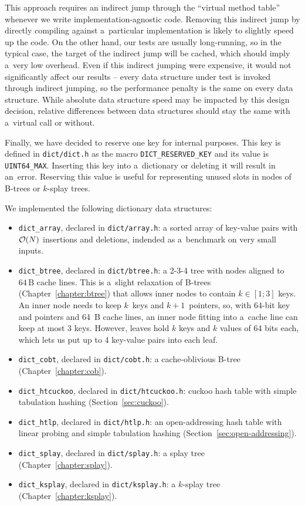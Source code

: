 This approach requires an indirect jump through the ``virtual method table''
whenever we write implementation-agnostic code. Removing this indirect jump
by directly compiling against a~particular implementation is likely to slightly
speed up the code. On the other hand, our tests are usually long-running, so in
the typical case, the target of the indirect jump will be cached, which should
imply a~very low overhead. Even if this indirect jumping were expensive, it
would not significantly affect our results -- every data structure under test
is invoked through indirect jumping, so the performance penalty is the same
on every data structure. While absolute data structure speed may be impacted
by this design decision, relative differences between data structures should
stay the same with a~virtual call or without.

Finally, we have decided to reserve one key for internal purposes.
This key is defined in \texttt{dict/dict.h} as the macro
\texttt{DICT\_RESERVED\_KEY} and its value is \texttt{UINT64\_MAX}.
Inserting this key into a~dictionary or deleting it will result in an~error.
Reserving this value is useful for representing unused slots in nodes of
\mbox{B-trees} or $k$-splay trees.

We implemented the following dictionary data structures:
\begin{itemize}
\item \texttt{dict\_array}, declared in \texttt{dict/array.h}:
	a sorted array of key-value pairs with $\mathcal{O}(N)$ insertions and deletions,
	indended as a~benchmark on very small inputs.
\item \texttt{dict\_btree}, declared in \texttt{dict/btree.h}:
	a 2-3-4 tree with nodes aligned to $64\,\text{B}$ cache lines.
	This is a~slight relaxation of B-trees (Chapter~\ref{chapter:btree})
	that allows inner nodes to contain $k\in[1;3]$ keys.
	An inner node needs to keep $k$~keys and $k+1$~pointers, so, with
	64-bit key and pointers and 64~B cache lines, an inner node fitting
	into a~cache line can keep at most 3 keys. However, leaves hold $k$
	keys and $k$ values of 64 bits each, which lets us put up to
	4 key-value pairs into each leaf.
\item \texttt{dict\_cobt}, declared in \texttt{dict/cobt.h}:
	a cache-oblivious B-tree (Chapter~\ref{chapter:cob}).
\item \texttt{dict\_htcuckoo}, declared in \texttt{dict/htcuckoo.h}:
	cuckoo hash table with simple tabulation hashing
	(Section~\ref{sec:cuckoo}).
\item \texttt{dict\_htlp}, declared in \texttt{dict/htlp.h}:
	an open-addressing hash table with linear probing and simple tabulation
	hashing (Section~\ref{sec:open-addressing}).
\item \texttt{dict\_splay}, declared in \texttt{dict/splay.h}:
	a splay tree (Chapter~\ref{chapter:splay}).
\item \texttt{dict\_ksplay}, declared in \texttt{dict/ksplay.h}:
	a $k$-splay tree (Chapter~\ref{chapter:ksplay}). %
\end{itemize}

